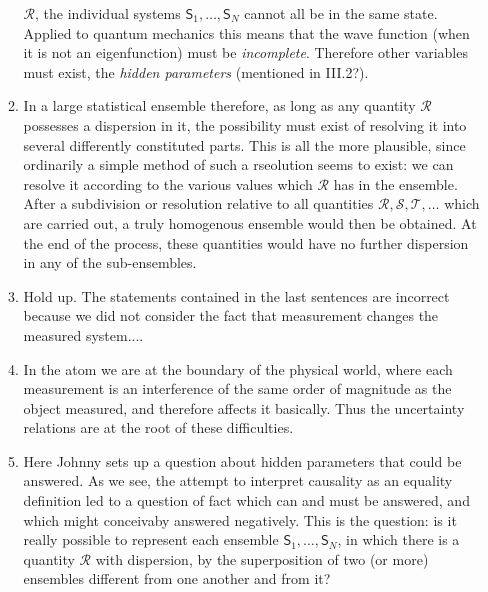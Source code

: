 \documentclass[a4paper]{article}
\theoremstyle{definition}
\theoremstyle{plain}
\begin{document}
\begin{enumerate}
\begin{enumerate}
                $\mathcal{R}$, the individual systems
                $\mathsf{S}_1,\ldots,\mathsf{S}_N$ cannot
                all be in the same state. {\color{blue}
                    Applied to quantum mechanics this means
                    that the wave function (when it is not
                    an eigenfunction) must be
                \textit{incomplete}.} Therefore other
                variables must exist, the \textit{hidden
                parameters} (mentioned in III.2?).
            \item In a large statistical ensemble therefore,
                as long as any quantity $\mathcal{R}$ 
                possesses a dispersion in it, the
                possibility must exist of resolving it into
                several differently constituted parts. This
                is all the more plausible, since ordinarily
                a simple method of such a rseolution seems
                to exist: we can resolve it according to the
                various values which $\mathcal{R}$ has in
                the ensemble. After a subdivision or
                resolution relative to all quantities
                $\mathcal{R},\mathcal{S},
                \mathcal{T},\ldots$ which are carried out, a
                truly homogenous ensemble would then be
                obtained. At the end of the process, these
                quantities would have no further dispersion
                in any of the sub-ensembles.
            \item {\color{blue} Hold up.} The statements
                contained in the last sentences are
                incorrect because we did not consider the
                fact that measurement changes the measured
                system....
            \item In the atom we are at the boundary of the
                physical world, where each measurement is an
                interference of the same order of magnitude
                as the object measured, and therefore
                affects it basically. Thus the uncertainty
                relations are at the root of these
                difficulties.
            \item {\color{blue} Here Johnny sets up a
                    question about hidden parameters that
                could be answered.} As we see, the attempt
                to interpret causality as an equality
                definition led to a question of fact which
                can and must be answered, and which might
                conceivaby answered negatively. This is the
                question: is it really possible to represent
                each ensemble
                $\mathsf{S}_1,\ldots,\mathsf{S}_N$, in which
                there is a quantity $\mathcal{R}$ with
                dispersion, by the superposition of two (or
                more) ensembles different from one another
                and from it?


\end{enumerate}
\end{enumerate}
\end{document}
